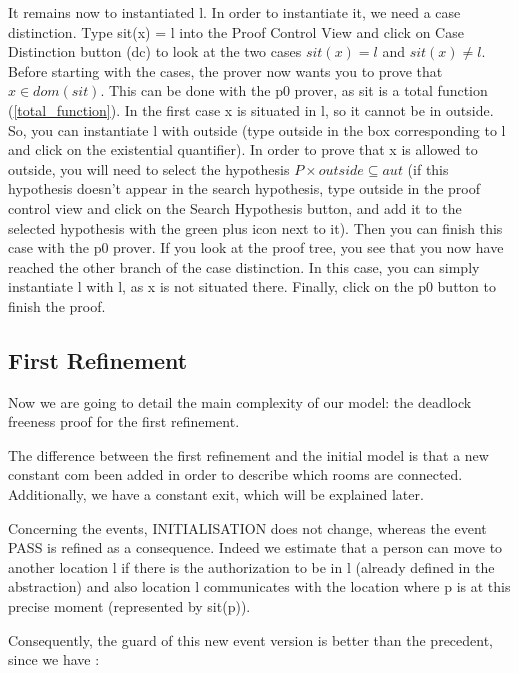 It remains now to instantiated \textsf{l}. In order to instantiate it, we need a case distinction. Type sit(x) = l into the \textsf{Proof Control View} and click on \textsf{Case Distinction button (dc)} to look at the two cases $sit(x) = l$ and $sit(x) \neq l$. Before starting with the cases, the prover now wants you to prove that $x \in dom(sit)$. This can be done with the \textsf{p0} prover, as \textsf{sit} is a total function (\ref{total_function}). In the first case \textsf{x} is situated in \textsf{l}, so it cannot be in \textsf{outside}. So, you can instantiate \textsf{l} with \textsf{outside} (type \textsf{outside} in the box corresponding to \textsf{l} and click on the existential quantifier). In order to prove that \textsf{x} is allowed to \textsf{outside}, you will need to select the hypothesis $P \times {outside} \subseteq aut$ (if this hypothesis doesn't appear in the search hypothesis, type outside in the proof control view and click on the \textsf{Search Hypothesis button}, and add it to the selected hypothesis with the green plus icon next to it). Then you can finish this case with the \textsf{p0} prover. If you look at the proof tree, you see that you now have reached the other branch of the case distinction. In this case, you can simply instantiate \textsf{l} with \textsf{l}, as \textsf{x} is not situated there. Finally, click on the \textsf{p0} button to finish the proof. 

\subsection{First Refinement}

Now we are going to detail the main complexity of our model: the deadlock freeness proof for the first refinement. 

The difference between the first refinement and the initial model is that a new constant \textsf{com} been added in order to describe which rooms are connected. Additionally, we have a constant \textsf{exit}, which will be explained later. 

Concerning the events, \textsf{INITIALISATION} does not change, whereas the event \textsf{PASS} is refined as a consequence. Indeed we estimate that a person can move to another location l if there is the authorization to be in l (already defined in the abstraction) and also location l communicates with the location where p is at this precise moment (represented by sit(p)).

Consequently, the guard of this new event version is better than the precedent, since we have :

